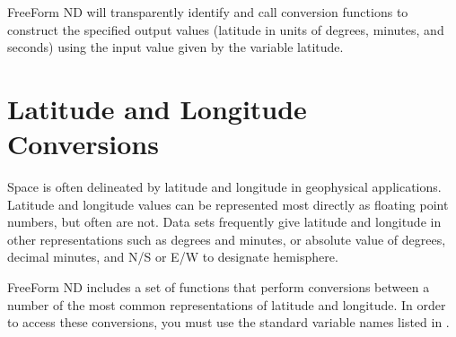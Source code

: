 FreeForm ND will transparently identify and call conversion functions
to construct the specified output values (latitude in units of
degrees, minutes, and seconds) using the input value given by the
variable latitude.

\section{Latitude and Longitude Conversions}
\label{ff,conv,latlon}

Space is often delineated by latitude and longitude in geophysical
applications. Latitude and longitude values can be represented most
directly as floating point numbers, but often are not. Data sets
frequently give latitude and longitude in other representations such
as degrees and minutes, or absolute value of degrees, decimal minutes,
and N/S or E/W to designate hemisphere.

FreeForm ND includes a set of functions that perform conversions
between a number of the most common representations of latitude and
longitude. In order to access these conversions, you must use the
standard variable names listed in .

